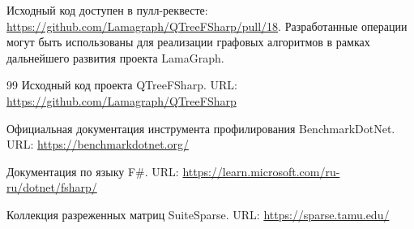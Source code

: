 \documentclass[a4paper]{article}
\begin{document}
Исходный код доступен в пулл-реквесте: \url{https://github.com/Lamagraph/QTreeFSharp/pull/18}. Разработанные операции могут быть использованы для реализации графовых алгоритмов в рамках дальнейшего развития проекта LamaGraph.

\begin{thebibliography}{99}
 Исходный код проекта QTreeFSharp. URL: \url{https://github.com/Lamagraph/QTreeFSharp}

 Официальная документация инструмента профилирования BenchmarkDotNet. URL: \url{https://benchmarkdotnet.org/}

 Документация по языку F\#. URL: \url{https://learn.microsoft.com/ru-ru/dotnet/fsharp/}

 Коллекция разреженных матриц SuiteSparse. URL: \url{https://sparse.tamu.edu/}
\end{thebibliography}
\end{document}
